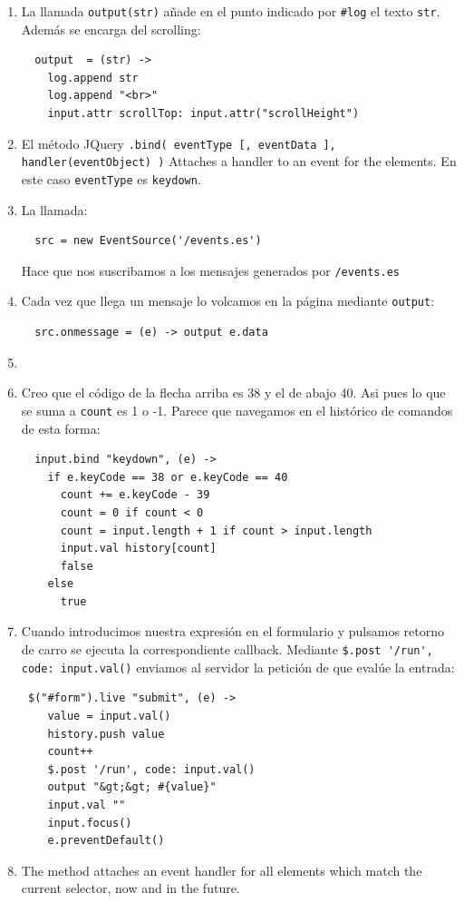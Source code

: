 \begin{enumerate}
\item 
La llamada \verb|output(str)| añade en el punto indicado por 
\verb|#log| el texto \verb|str|. Además se encarga del scrolling:
\begin{verbatim}
  output  = (str) ->
    log.append str
    log.append "<br>"
    input.attr scrollTop: input.attr("scrollHeight")
\end{verbatim}
\item  El método JQuery
\verb|.bind( eventType [, eventData ], handler(eventObject) )|
Attaches a handler to an event for the elements.
En este caso \verb|eventType| es \verb|keydown|.
\item 
La llamada:
\begin{verbatim}
  src = new EventSource('/events.es')
\end{verbatim}
Hace que nos suscribamos a los mensajes generados por 
\verb|/events.es|
\item 
Cada vez que llega un mensaje lo volcamos en la página mediante \verb|output|:
\begin{verbatim}
  src.onmessage = (e) -> output e.data
\end{verbatim}

\item 
{}
\item 
Creo que el código de la flecha arriba es 38
y el de abajo 40. Asi pues lo que se suma a \verb|count| es 1 o -1.
Parece que navegamos en el histórico de comandos de esta forma:
\begin{verbatim}
  input.bind "keydown", (e) ->
    if e.keyCode == 38 or e.keyCode == 40
      count += e.keyCode - 39
      count = 0 if count < 0
      count = input.length + 1 if count > input.length
      input.val history[count]
      false
    else
      true
\end{verbatim}
\item  Cuando introducimos nuestra expresión en el formulario y pulsamos retorno
de carro se ejecuta la correspondiente callback. Mediante \verb|$.post '/run', code: input.val()| enviamos al servidor la petición de que evalúe la entrada: 
\begin{verbatim}
 $("#form").live "submit", (e) ->
    value = input.val()
    history.push value
    count++
    $.post '/run', code: input.val()
    output "&gt;&gt; #{value}"
    input.val ""
    input.focus()
    e.preventDefault()
\end{verbatim}
\item 
The
 method
attaches an event handler for all elements which match the current selector, now and in the future.


\end{enumerate}
